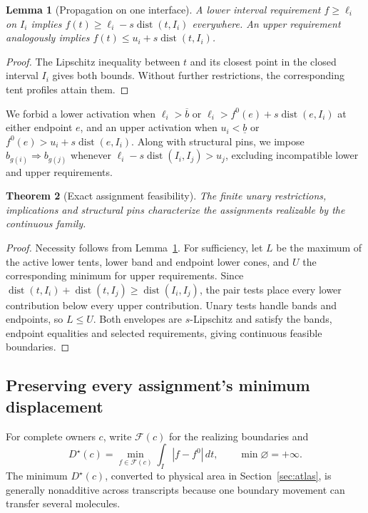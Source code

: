 \documentclass[10pt,letterpaper]{article}
\newtheorem{theorem}{Theorem}
\newtheorem{lemma}[theorem]{Lemma}
\newcommand{\dist}{\operatorname{dist}}
\begin{document}
\begin{lemma}[Propagation on one interface]\label{lem:kernel}
A lower interval requirement $f\ge\ell_i$ on $I_i$ implies
$f(t)\ge\ell_i-s\dist(t,I_i)$ everywhere. An upper requirement analogously implies $f(t)\le u_i+s\dist(t,I_i)$.
\end{lemma}
\begin{proof}
The Lipschitz inequality between $t$ and its closest point in the closed interval $I_i$ gives both bounds. Without further restrictions, the corresponding tent profiles attain them.
\end{proof}

We forbid a lower activation when $\ell_i>\overline b$ or $\ell_i>f^0(e)+s\dist(e,I_i)$ at either endpoint $e$, and an upper activation when $u_i<\underline b$ or $f^0(e)>u_i+s\dist(e,I_i)$. Along with structural pins, we impose $b_{g(i)}\Rightarrow b_{g(j)}$ whenever $\ell_i-s\dist(I_i,I_j)>u_j$, excluding incompatible lower and upper requirements.

\begin{theorem}[Exact assignment feasibility]\label{thm:feas}
The finite unary restrictions, implications and structural pins characterize the assignments realizable by the continuous family.
\end{theorem}
\begin{proof}
Necessity follows from Lemma~\ref{lem:kernel}. For sufficiency, let $L$ be the maximum of the active lower tents, lower band and endpoint lower cones, and $U$ the corresponding minimum for upper requirements. Since $\dist(t,I_i)+\dist(t,I_j)\ge\dist(I_i,I_j)$, the pair tests place every lower contribution below every upper contribution. Unary tests handle bands and endpoints, so $L\le U$. Both envelopes are $s$-Lipschitz and satisfy the bands, endpoint equalities and selected requirements, giving continuous feasible boundaries.
\end{proof}

\subsection{Preserving every assignment's minimum displacement}
For complete owners $c$, write $\mathcal F(c)$ for the realizing boundaries and
\begin{equation}
 D^\star(c)=\min_{f\in\mathcal F(c)}\int_I|f-f^0|\,dt,\qquad \min\varnothing=+\infty.\label{eq:dstar}
\end{equation}
The minimum $D^\star(c)$, converted to physical area in Section~\ref{sec:atlas}, is generally nonadditive across transcripts because one boundary movement can transfer several molecules.
\end{document}
